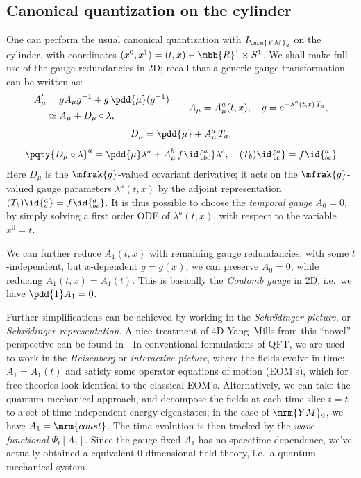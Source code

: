 \documentclass[a4paper
	,10pt
]{article}
\newcommand{\YM}{{\ensuremath{\mrm{YM}_2}}\xspace}
\begin{document}
\subsection{Canonical quantization on the cylinder}
	One can perform the usual canonical quantization with $I_\YM$ on the cylinder, with coordinates $(x^0,x^1) = (t,x) \in \mbb{R}^1\times S^1$. We shall make full use of the gauge redundancies in 2D; recall that a generic gauge transformation can be written as:
	\begin{equation}
	\begin{aligned}
		A'_\mu
		&= g A_\mu g^{-1}
			+ g\,\pdd{\mu} (g^{-1}) \\
		&\simeq A_\mu
			+ D_\mu\circ\lambda,
	\end{aligned}
	\qquad
		A_\mu = A^a_\mu(t,x),
	\quad
		g = e^{-\lambda^a(t,x)\,T_a},
	\end{equation}
	\vspace{-1.2\baselineskip}
	\begin{gather}
		D_\mu = \pdd{\mu} + A_\mu^a\,T_a,
	\\[1ex]
		\pqty{D_\mu\circ\lambda}^a
		= \pdd{\mu} \lambda^a
			+ A_\mu^b\,f\id{^a_{bc}} \lambda^c,
	\quad
		(T_b)\id{^a_c} = f\id{^a_{bc}}
	\end{gather}
	Here $D_\mu$ is the $\mfrak{g}$-valued covariant derivative; it acts on the $\mfrak{g}$-valued gauge parameters $\lambda^a(t,x)$ by the adjoint representation $(T_b)\id{^a_c} = f\id{^a_{bc}}$. 
	It is thus possible to choose the \textit{temporal gauge} $A_0 = 0$, by simply solving a first order ODE of $\lambda^a(t,x)$, with respect to the variable $x^0 = t$. 
	
	We can further reduce $A_1(t,x)$ with remaining gauge redundancies; with some $t$-independent, but $x$-dependent $g = g(x)$, we can preserve $A_0 = 0$, while reducing $A_1(t,x) = A_1(t)$. This is basically the \textit{Coulomb gauge} in 2D, i.e.~we have $\pdd{1} A_1 = 0$. 
	
	Further simplifications can be achieved by working in the \textit{Schr\"odinger picture}, or \textit{Schr\"odinger representation}. A nice treatment of 4D Yang--Mills from this ``novel'' perspective can be found in \cite{Hatfield:234595}. In conventional formulations of QFT, we are used to work in the \textit{Heisenberg} or \textit{interactive picture}, where the fields evolve in time: $A_1 = A_1(t)$ and satisfy some operator equations of motion (EOM's), which for free theories look identical to the classical EOM's. Alternatively, we can take the quantum mechanical approach, and decompose the fields at each time slice $t = t_0$ to a set of time-independent energy eigenstates; in the case of \YM, we have $A_1 = \mrm{const}$. 
	The time evolution is then tracked by the \textit{wave functional} $\Psi_t[A_1]$. Since the gauge-fixed $A_1$ has no spacetime dependence, we've actually obtained a equivalent 0-dimensional field theory, i.e.~a quantum mechanical system. 
	
\end{document}
